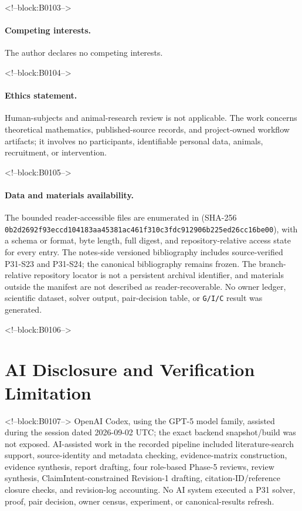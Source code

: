 \documentclass[11pt]{article}
\begin{document}
<!--block:B0103-->
\paragraph{Competing interests.} The author declares no competing
interests.

<!--block:B0104-->
\paragraph{Ethics statement.} Human-subjects and animal-research review
is not applicable. The work concerns theoretical mathematics,
published-source records, and project-owned workflow artifacts; it
involves no participants, identifiable personal data, animals,
recruitment, or intervention.

<!--block:B0105-->
\paragraph{Data and materials availability.}\begingroup\sloppy
The bounded reader-accessible files
are enumerated in
 (SHA-256
\texttt{0b2d2692f93eccd1\allowbreak{}04183aa45381ac46\allowbreak{}1f310c3fdc912906\allowbreak{}b225ed26cc16be00}), with a schema or format, byte length, full digest, and
repository-relative access state for every entry.  The notes-side versioned
bibliography includes source-verified P31-S23 and P31-S24; the canonical
bibliography remains frozen.  The branch-relative repository locator is not a
persistent archival identifier, and materials outside the manifest are not
described as reader-recoverable.  No owner ledger, scientific dataset, solver
output, pair-decision table, or \texttt{G/I/C} result was generated.
\par\endgroup

<!--block:B0106-->
\hypertarget{ai-disclosure-and-verification-limitation}{%
\section*{AI Disclosure and Verification
Limitation}\label{ai-disclosure-and-verification-limitation}}

<!--block:B0107-->
OpenAI Codex, using the GPT-5 model family, assisted during the session
dated 2026-09-02 UTC; the exact backend snapshot/build was not exposed.
AI-assisted work in the recorded pipeline included literature-search
support, source-identity and metadata checking, evidence-matrix
construction, evidence synthesis, report drafting, four role-based
Phase-5 reviews, review synthesis, ClaimIntent-constrained Revision-1
drafting, citation-ID/reference closure checks, and revision-log
accounting. No AI system executed a P31 solver, proof, pair decision,
owner census, experiment, or canonical-results refresh.
\end{document}
